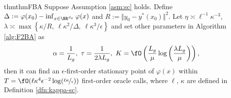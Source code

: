\documentclass{article}
\begin{document}

\begin{restatable}{thm}{thmFBA}\label{thm:F2BA}
Suppose Assumption \ref{asm:sc} holds. Define
$\Delta:=\varphi(x_0) - \inf_{x \in \BR^{d_x}} \varphi(x)$ and $R := \Vert y_0 - y^*(x_0) \Vert^2 $.
Let $\eta \asymp \ell^{-1}\kappa^{-3}$, $\lambda \asymp \max\left\{\kappa/R,~ \ell \kappa^2/ \Delta, ~ \ell \kappa^3 / \epsilon \right\} $
and set other parameters 
in Algorithm \ref{alg:F2BA} as
\begin{align*}
     \alpha = \frac{1}{L_g}, ~ \tau = \frac{1}{2 \lambda L_g},~ K = \fO\left( \frac{L_g }{\mu} \log \left( \frac{\lambda L_g}{\mu} \right) \right),
\end{align*}
then it
can find an $\epsilon$-first-order stationary point of $\varphi(x)$ within $ T = \fO( \ell \kappa^4 \epsilon^{-2} \log(\nicefrac{\ell \kappa}{\epsilon})) $ first-order oracle calls, where $\ell$,  $\kappa$ are defined in Definition \ref{dfn:kappa-sc}.
\end{restatable}


\end{document}
